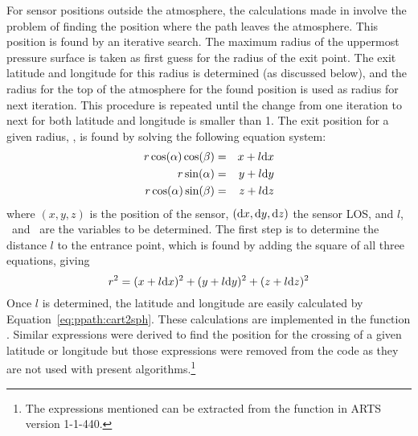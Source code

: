 For sensor positions outside the atmosphere, the calculations made in
 involve the problem of finding the
position where the path leaves the atmosphere. This position is found
by an iterative search. The maximum radius of the uppermost pressure
surface is taken as first guess for the radius of the exit point.  The
exit latitude and longitude for this radius is determined (as
discussed below), and the radius for the top of the atmosphere for the
found position is used as radius for next iteration. This procedure is
repeated until the change from one iteration to next for both latitude
and longitude is smaller than 1. The exit position for
a given radius, \Rds, is found by solving the following equation
system:
\begin{eqnarray}
  r \cos(\alpha) \cos(\beta)  & = & x+l\mathrm{d} x \nonumber \\
  r \sin(\alpha)             & = & y+l\mathrm{d} y \\
  r \cos(\alpha) \sin(\beta)  & = & z+l\mathrm{d} z \nonumber
  \label{eq:ppath:rcoss3Da}
\end{eqnarray}
where $(x,y,z)$ is the position of the sensor, $(\mathrm{d} x,\mathrm{d}
y,\mathrm{d} z)$ the sensor LOS, and $l$, \Lat\ and \Lon\ are the variables
to be determined. The first step is to determine the distance $l$ to
the entrance point, which is found by adding the square of all three
equations, giving
\begin{equation}
  r^2 = (x+l\mathrm{d} x)^2 + (y+l\mathrm{d} y)^2 + (z+l\mathrm{d} z)^2
  \label{eq:ppath:rcoss3Db}
\end{equation}
Once $l$ is determined, the latitude and longitude are easily
calculated by Equation~\ref{eq:ppath:cart2sph}. These calculations are
implemented in the function .
Similar expressions were derived to find the position for the crossing
of a given latitude or longitude but those expressions were removed
from the code as they are not used with present
algorithms.\footnote{The expressions mentioned can be extracted from
  the function  in ARTS version
  1-1-440.}



\label{sec:ppath:refreuler}





\label{sec:ppath:geoids}


